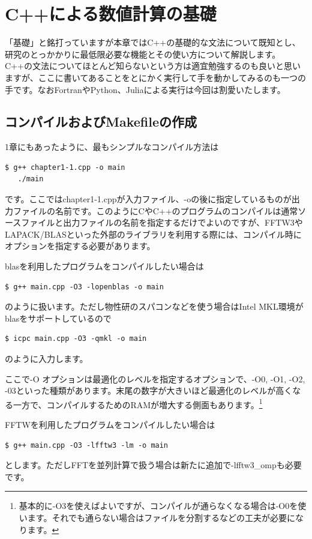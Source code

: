 \documentclass[12pt]{jreport}
\begin{document}
\chapter{C++による数値計算の基礎}
「基礎」と銘打っていますが本章ではC++の基礎的な文法について既知とし、研究のとっかかりに最低限必要な機能とその使い方について解説します。C++の文法についてほとんど知らないという方は適宜勉強するのも良いと思いますが、ここに書いてあることをとにかく実行して手を動かしてみるのも一つの手です。なおFortranやPython、Juliaによる実行は今回は割愛いたします。

\section{コンパイルおよびMakefileの作成}
1章にもあったように、最もシンプルなコンパイル方法は
\begin{lstlisting}[style=terminal]
  $ g++ chapter1-1.cpp -o main
   ./main
\end{lstlisting}
です。ここではchapter1-1.cppが入力ファイル、-oの後に指定しているものが出力ファイルの名前です。このようにCやC++のプログラムのコンパイルは通常ソースファイルと出力ファイルの名前を指定するだけでよいのですが、FFTW3やLAPACK/BLASといった外部のライブラリを利用する際には、コンパイル時にオプションを指定する必要があります。

blasを利用したプログラムをコンパイルしたい場合は
\begin{lstlisting}[style=terminal]
  $ g++ main.cpp -O3 -lopenblas -o main
\end{lstlisting}
のように扱います。ただし物性研のスパコンなどを使う場合はIntel MKL環境がblasをサポートしているので
\begin{lstlisting}[style=terminal]
  $ icpc main.cpp -O3 -qmkl -o main
\end{lstlisting}
のように入力します。

ここで-O オプションは最適化のレベルを指定するオプションで、-O0, -O1, -O2, -03といった種類があります。末尾の数字が大きいほど最適化のレベルが高くなる一方で、コンパイルするためのRAMが増大する側面もあります。\footnote{基本的に-O3を使えばよいですが、コンパイルが通らなくなる場合は-O0を使います。それでも通らない場合はファイルを分割するなどの工夫が必要になります。}

FFTWを利用したプログラムをコンパイルしたい場合は
\begin{lstlisting}[style=terminal]
$ g++ main.cpp -O3 -lfftw3 -lm -o main  
\end{lstlisting}
とします。ただしFFTを並列計算で扱う場合は新たに追加で-lfftw3_ompも必要です。
\end{document}
